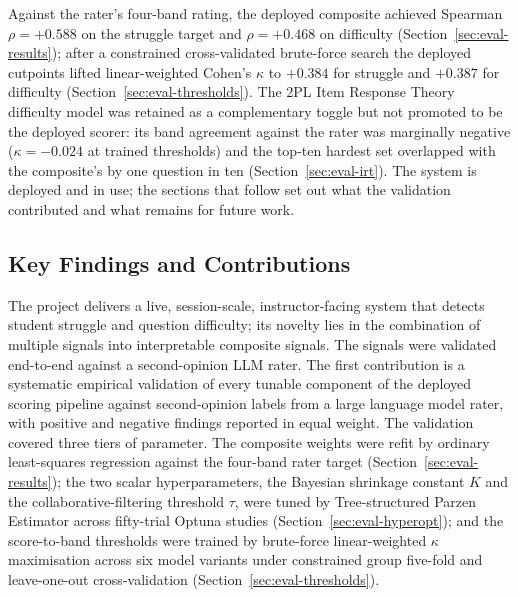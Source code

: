 Against the rater's four-band rating, the deployed composite achieved Spearman $\rho = +0.588$ on the struggle target and $\rho = +0.468$ on difficulty (Section~\ref{sec:eval-results}); after a constrained cross-validated brute-force search the deployed cutpoints lifted linear-weighted Cohen's $\kappa$ to $+0.384$ for struggle and $+0.387$ for difficulty (Section~\ref{sec:eval-thresholds}).
The 2PL Item Response Theory difficulty model was retained as a complementary toggle but not promoted to be the deployed scorer: its band agreement against the rater was marginally negative ($\kappa = -0.024$ at trained thresholds) and the top-ten hardest set overlapped with the composite's by one question in ten (Section~\ref{sec:eval-irt}).
The system is deployed and in use; the sections that follow set out what the validation contributed and what remains for future work.

\subsection{Key Findings and Contributions}
The project delivers a live, session-scale, instructor-facing system that detects student struggle and question difficulty; its novelty lies in the combination of multiple signals into interpretable composite signals. 
The signals were validated end-to-end against a second-opinion LLM rater. 
The first contribution is a systematic empirical validation of every tunable component of the deployed scoring pipeline against second-opinion labels from a large language model rater, with positive and negative findings reported in equal weight.
The validation covered three tiers of parameter.
The composite weights were refit by ordinary least-squares regression against the four-band rater target (Section~\ref{sec:eval-results}); the two scalar hyperparameters, the Bayesian shrinkage constant $K$ and the collaborative-filtering threshold $\tau$, were tuned by Tree-structured Parzen Estimator across fifty-trial Optuna studies (Section~\ref{sec:eval-hyperopt}); and the score-to-band thresholds were trained by brute-force linear-weighted $\kappa$ maximisation across six model variants under constrained group five-fold and leave-one-out cross-validation (Section~\ref{sec:eval-thresholds}).

